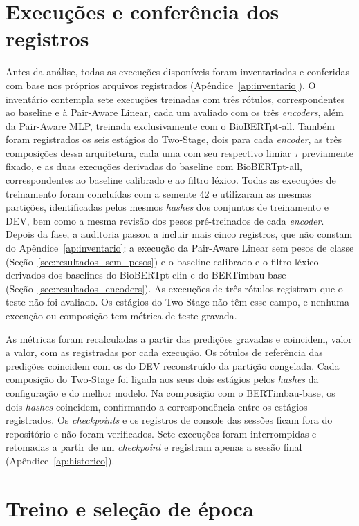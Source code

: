 \section{Execuções e conferência dos registros}
\label{sec:inventario}

Antes da análise, todas as execuções disponíveis foram inventariadas e conferidas com base nos próprios arquivos registrados (Apêndice~\ref{ap:inventario}). O inventário contempla sete execuções treinadas com três rótulos, correspondentes ao baseline e à Pair-Aware Linear, cada um avaliado com os três \emph{encoders}, além da Pair-Aware MLP, treinada exclusivamente com o BioBERTpt-all. Também foram registrados os seis estágios do Two-Stage, dois para cada \emph{encoder}, as três composições dessa arquitetura, cada uma com seu respectivo limiar $\tau$ previamente fixado, e as duas execuções derivadas do baseline com BioBERTpt-all, correspondentes ao baseline calibrado e ao filtro léxico. Todas as execuções de treinamento foram concluídas com a semente $42$ e utilizaram as mesmas partições, identificadas pelos mesmos \emph{hashes} dos conjuntos de treinamento e DEV, bem como a mesma revisão dos pesos pré-treinados de cada \emph{encoder}. Depois da fase, a auditoria passou a incluir mais cinco registros, que
não constam do Apêndice~\ref{ap:inventario}: a execução da Pair-Aware Linear sem
pesos de classe (Seção~\ref{sec:resultados_sem_pesos}) e o baseline calibrado e o
filtro léxico derivados dos baselines do BioBERTpt-clin e do BERTimbau-base
(Seção~\ref{sec:resultados_encoders}). As execuções de três rótulos registram que
o teste não foi avaliado. Os estágios do Two-Stage não têm esse campo, e nenhuma
execução ou composição tem métrica de teste gravada.

As métricas foram recalculadas a partir das predições gravadas e coincidem, valor a
valor, com as registradas por cada execução. Os rótulos de referência das predições
coincidem com os do DEV reconstruído da partição congelada. Cada composição do
Two-Stage foi ligada aos seus dois estágios pelos \emph{hashes} da configuração e do
melhor modelo. Na composição com o BERTimbau-base, os dois \emph{hashes} coincidem, confirmando a correspondência entre os estágios registrados. Os \emph{checkpoints} e os registros
de console das sessões ficam fora do repositório e não foram verificados. Sete
execuções foram interrompidas e retomadas a partir de um \emph{checkpoint} e
registram apenas a sessão final (Apêndice~\ref{ap:historico}).

\section{Treino e seleção de época}
\label{sec:curvas}

